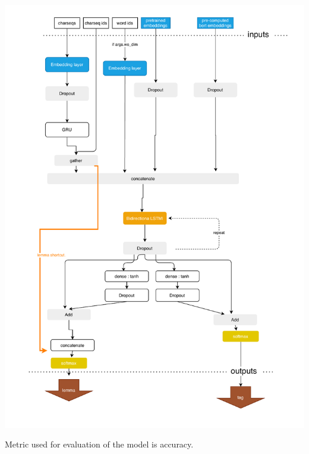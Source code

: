\includegraphics[width=\columnwidth]{../img/taggermodel.pdf}

Metric used for evaluation of the model is accuracy.


